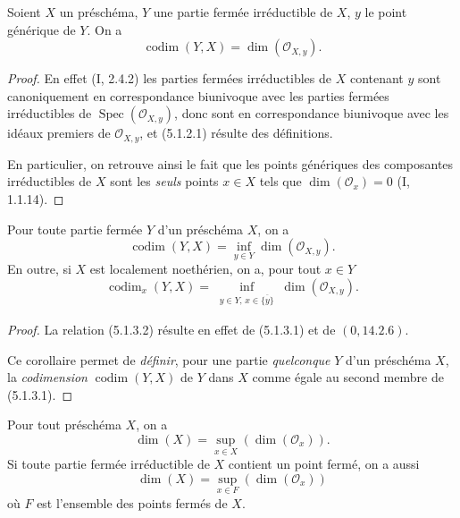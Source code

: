 \begin{proposition}[5.1.2]
\label{IV.2.5.1.2-fr}
Soient $X$ un préschéma, $Y$ une partie fermée irréductible de $X$, $y$ le
point générique de $Y$. On a
\begin{equation}
\operatorname{codim}(Y,X)=\dim(\mathcal O_{X,y}).
\tag{5.1.2.1}\label{IV.2.5.1.2.1-fr}
\end{equation}
\end{proposition}

\begin{proof}
En effet (I, 2.4.2) les parties fermées irréductibles de $X$ contenant $y$
sont canoniquement en correspondance biunivoque avec les parties fermées
irréductibles de $\operatorname{Spec}(\mathcal O_{X,y})$, donc sont en
correspondance biunivoque avec les idéaux premiers de $\mathcal O_{X,y}$, et
(5.1.2.1) résulte des définitions.

En particulier, on retrouve ainsi le fait que les points génériques des
composantes irréductibles de $X$ sont les \emph{seuls} points $x\in X$ tels
que $\dim(\mathcal O_x)=0$ (I, 1.1.14).
\end{proof}


\begin{corollary}[5.1.3]
\label{IV.2.5.1.3-fr}
Pour toute partie fermée $Y$ d'un préschéma $X$, on a
\begin{equation}
\operatorname{codim}(Y,X)=\inf_{y\in Y}\dim(\mathcal O_{X,y}).
\tag{5.1.3.1}\label{IV.2.5.1.3.1-fr}
\end{equation}
En outre, si $X$ est localement noethérien, on a, pour tout $x\in Y$
\begin{equation}
\operatorname{codim}_x(Y,X)=
\inf_{\substack{y\in Y,\,x\in\overline{\{y\}}}}
\dim(\mathcal O_{X,y}).
\tag{5.1.3.2}\label{IV.2.5.1.3.2-fr}
\end{equation}
\end{corollary}

\begin{proof}
La relation (5.1.3.2) résulte en effet de (5.1.3.1) et de $(0,14.2.6)$.

Ce corollaire permet de \emph{définir}, pour une partie \emph{quelconque}
$Y$ d'un préschéma $X$, la \emph{codimension} $\operatorname{codim}(Y,X)$ de
$Y$ dans $X$ comme égale au second membre de (5.1.3.1).
\end{proof}

\begin{proposition}[5.1.4]
\label{IV.2.5.1.4-fr}
Pour tout préschéma $X$, on a
\begin{equation}
\dim(X)=\sup_{x\in X}(\dim(\mathcal O_x)).
\tag{5.1.4.1}\label{IV.2.5.1.4.1-fr}
\end{equation}
Si toute partie fermée irréductible de $X$ contient un point fermé, on a aussi
\begin{equation}
\dim(X)=\sup_{x\in F}(\dim(\mathcal O_x))
\tag{5.1.4.2}\label{IV.2.5.1.4.2-fr}
\end{equation}
où $F$ est l'ensemble des points fermés de $X$.
\end{proposition}

